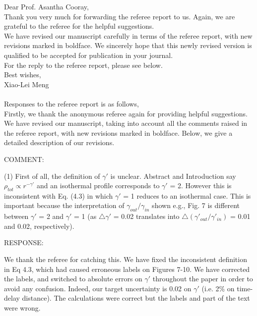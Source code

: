 \documentclass[a4paper,11pt]{article}
\begin{document}
Dear Prof. Asantha Cooray,
\\

Thank you very much for forwarding the referee report to us. Again, we
are grateful to the referee for the helpful suggestions.
\\

We have revised our manuscript carefully in terms of the referee report, with new revisions marked in boldface. We sincerely hope that this newly revised version is qualified to be accepted for publication in your journal.
\\

For the reply to the referee report, please see below.
\\

Best wishes,
\\

Xiao-Lei Meng
\\
\\

Responses to the referee report is as follows,
\\

Firstly, we thank the anonymous referee again for providing helpful
suggestions. We have revised our manuscript, taking into account all
the comments raised in the referee report, with new revisions marked
in boldface. Below, we give a detailed description of our revisions.

COMMENT:

(1) First of all, the definition of $\gamma'$ is unclear. Abstract and
Introduction say $\rho_{tot} \propto r^{-\gamma'}$ and an isothermal
profile corresponds to $\gamma'$ = 2. However this is inconsistent
with Eq. (4.3) in which $\gamma'$ = 1 reduces to an isothermal
case. This is important because the interpretation of
$\gamma_{out}/\gamma_{in}$ shown e.g., Fig. 7 is different between
$\gamma'$ = 2 and $\gamma'$ = 1 (as $\bigtriangleup \gamma'$ = 0.02
translates into $\bigtriangleup (\gamma'_{out}/\gamma'_{in})$ = 0.01
and 0.02, respectively).

RESPONSE:

We thank the referee for catching this. We have fixed the inconsistent
definition in Eq 4.3, which had caused erroneous labels on Figures
7-10. We have corrected the labels, and switched to absolute errors on
$\gamma'$ throughout the paper in order to avoid any
confusion. Indeed, our target uncertainty is 0.02 on $\gamma'$
(i.e. 2\% on time-delay distance). The calculations were correct but
the labels and part of the text were wrong.
\end{document}
